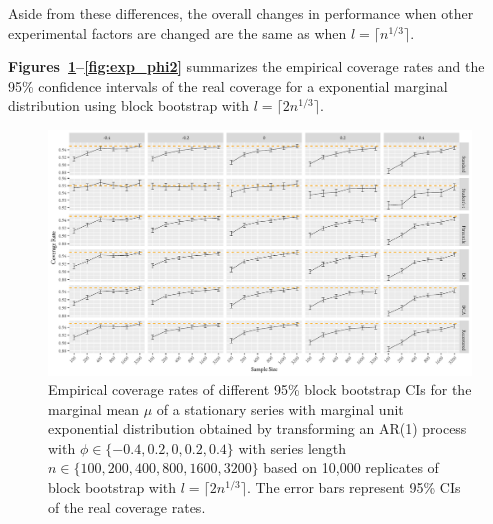 \documentclass[10pt]{article}
\begin{document}
Aside from these differences, the overall changes
in performance when other experimental factors are changed are the same as
when $l = \lceil n^{1/3} \rceil$.

\textbf{Figures~\ref{fig:exp_mu2}--\ref{fig:exp_phi2}} 
summarizes the empirical coverage rates and the 95\% confidence intervals of the 
real coverage for a exponential marginal distribution using block bootstrap
with $l = \lceil 2n^{1/3} \rceil$.

\begin{figure}[tbp]
  \centering
  \includegraphics[width=\textwidth]{figures/plot_exp_mu_2}
  \caption{Empirical coverage rates of different 95\% block bootstrap CIs for
    the marginal mean $\mu$ of a stationary series with marginal unit exponential
    distribution obtained by transforming an AR(1) process with
    $\phi \in \{-0.4, 0.2, 0, 0.2, 0.4\}$ with series length
    $n \in \{100, 200, 400, 800, 1600, 3200\}$ based on 10,000 replicates of
    block bootstrap with $l = \lceil 2n^{1/3} \rceil$. 
    The error bars represent 95\% CIs of the real coverage rates.}
  \label{fig:exp_mu2}
\end{figure}
\end{document}
